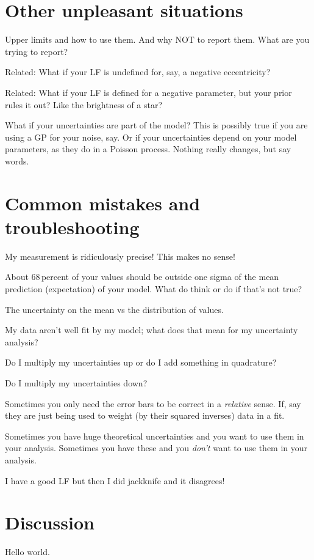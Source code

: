 \documentclass[10pt]{article}
\begin{document}
\section{Other unpleasant situations}

Upper limits and how to use them. And why NOT to report them. What are
you trying to report?

Related: What if your LF is undefined for, say, a negative eccentricity?

Related: What if your LF is defined for a negative parameter, but your
prior rules it out? Like the brightness of a star?

What if your uncertainties are part of the model? This is possibly
true if you are using a GP for your noise, say. Or if your
uncertainties depend on your model parameters, as they do in a Poisson
process. Nothing really changes, but say words.

\section{Common mistakes and troubleshooting}

My measurement is ridiculously precise! This makes no sense!

About 68\,percent of your values should be outside one sigma of the
mean prediction (expectation) of your model. What do think or do if
that's not true?

The uncertainty on the mean vs the distribution of values.

My data aren't well fit by my model; what does that mean for my uncertainty
analysis?

Do I multiply my uncertainties up or do I add something in quadrature?

Do I multiply my uncertainties down?

Sometimes you only need the error bars to be correct in a
\emph{relative} sense. If, say they are just being used to weight (by
their squared inverses) data in a fit.

Sometimes you have huge theoretical uncertainties and you want to use
them in your analysis. Sometimes you have these and you \emph{don't} want
to use them in your analysis.

I have a good LF but then I did jackknife and it disagrees!

\section{Discussion}

Hello world.

\clearpage\raggedright

\end{document}
